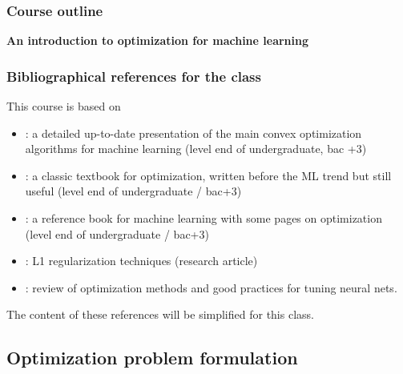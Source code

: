 \documentclass[12pt]{beamer}
\begin{document}
\begin{frame}%
\frametitle{Course outline} 
\begin{center} \textbf{An introduction to optimization for machine learning} \end{center}
\tableofcontents[currentsection]
\end{frame}

\begin{frame}
\frametitle{Bibliographical references for the class}
{\small
This course is based on
\begin{itemize}
\item \cite{ravikumar17} : a detailed up-to-date presentation of the main convex optimization algorithms for machine learning (level end of undergraduate, bac +3)
\item \cite{minoux2008programmation} : a classic textbook for optimization, written before the ML trend but still useful (level end of undergraduate / bac+3)
\item \cite{bishop2006pattern} : a reference book for machine learning with some pages on optimization (level end of undergraduate / bac+3)
\item \cite{schmidt2007fast} : L1 regularization techniques (research article)
\item \cite{sun2019optimization} : review of optimization methods and good practices for tuning neural nets.
\end{itemize}
The content of these references will be simplified for this class.
} %
\end{frame}

\subsection{Optimization problem formulation}
\end{document}
